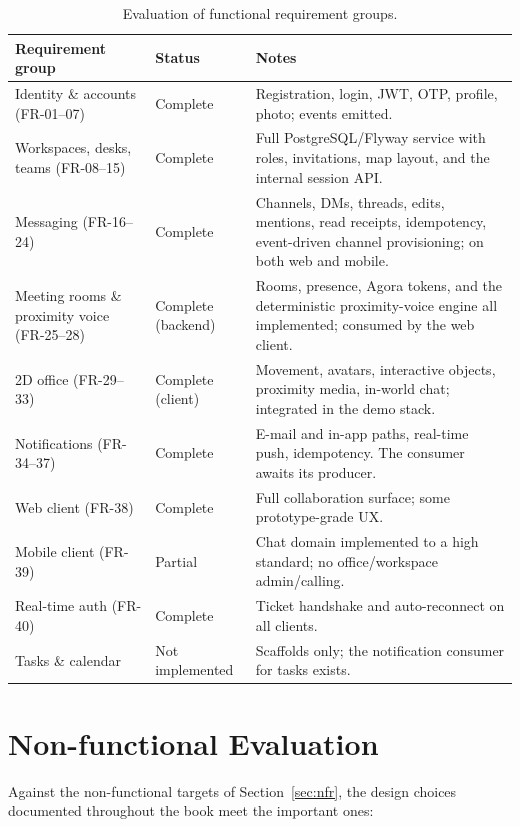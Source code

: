 \begin{table}[htbp]
\centering
\caption{Evaluation of functional requirement groups.}
\label{tab:eval}
\small
\begin{tabularx}{\textwidth}{L{4.4cm} L{2.4cm} X}
\toprule
\textbf{Requirement group} & \textbf{Status} & \textbf{Notes} \\
\midrule
Identity \& accounts (FR-01--07) & Complete & Registration, login, JWT, OTP, profile, photo; events emitted. \\
Workspaces, desks, teams (FR-08--15) & Complete & Full PostgreSQL/Flyway service with roles, invitations, map layout, and the internal session API. \\
Messaging (FR-16--24) & Complete & Channels, DMs, threads, edits, mentions, read receipts, idempotency, event-driven channel provisioning; on both web and mobile. \\
Meeting rooms \& proximity voice (FR-25--28) & Complete (backend) & Rooms, presence, Agora tokens, and the deterministic proximity-voice engine all implemented; consumed by the web client. \\
2D office (FR-29--33) & Complete (client) & Movement, avatars, interactive objects, proximity media, in-world chat; integrated in the demo stack. \\
Notifications (FR-34--37) & Complete & E-mail and in-app paths, real-time push, idempotency. The  consumer awaits its producer. \\
Web client (FR-38) & Complete & Full collaboration surface; some prototype-grade UX. \\
Mobile client (FR-39) & Partial & Chat domain implemented to a high standard; no office/workspace admin/calling. \\
Real-time auth (FR-40) & Complete & Ticket handshake and auto-reconnect on all clients. \\
Tasks \& calendar & Not implemented & Scaffolds only; the notification consumer for tasks exists. \\
\bottomrule
\end{tabularx}
\end{table}

\section{Non-functional Evaluation}

Against the non-functional targets of Section~\ref{sec:nfr}, the design choices
documented throughout the book meet the important ones:

